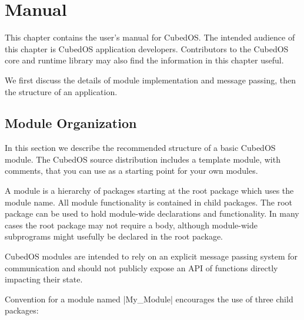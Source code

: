 
\chapter{Manual}
\label{chapt:manual}

This chapter contains the user's manual for CubedOS. The intended audience of this chapter is
CubedOS application developers. Contributors to the CubedOS core and runtime library may also
find the information in this chapter useful.

We first discuss the details of module implementation and message passing, then the structure of an application.

\section{Module Organization}
\label{sec:module-organization}

In this section we describe the recommended structure of a basic CubedOS module. The CubedOS source
distribution includes a template module, with comments, that you can use as a starting point for
your own modules.

A module is a hierarchy of packages starting at the root package which uses the module name. All module functionality is contained in child packages. The root package can be used to hold module-wide declarations and functionality. In many cases the root package may not require a
body, although module-wide subprograms might usefully be declared in the root package.

CubedOS modules are intended to rely on an explicit message passing system for communication and should not publicly expose an API of functions directly impacting their state.

Convention for a module named |My_Module| encourages the use of three child packages:

